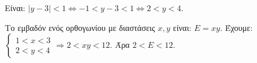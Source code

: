 
\begin{alist}
\item Είναι: $|y - 3| < 1 \Leftrightarrow -1 < y - 3 < 1 \Leftrightarrow 2 < y < 4$.

\item Το εμβαδόν ενός ορθογωνίου με διαστάσεις $x, y$ είναι: $E = xy$.
Έχουμε:
$\begin{cases} 1 < x < 3 \\ 2 < y < 4 \end{cases} \Rightarrow 2 < xy < 12$. Άρα $2 < E < 12$.
\end{alist}


